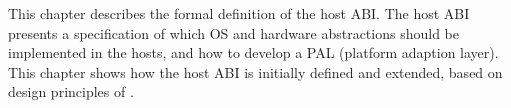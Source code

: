 This chapter describes the formal definition of the host ABI.
The host ABI presents a specification of which OS and hardware abstractions should be implemented in the hosts, %
and how to develop
a PAL (platform adaption layer).
This chapter shows how the host ABI is initially defined and extended,
based on design principles of \graphene{}. %


















%
%
%











